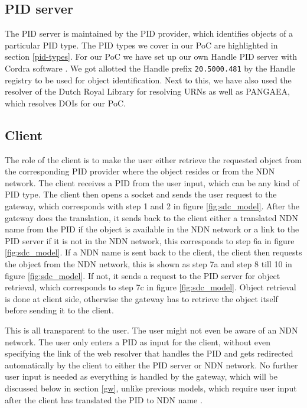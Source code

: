 \subsection{PID server}
The PID server is maintained by the PID provider, which identifies objects of a particular PID type. The PID types we cover in our PoC are highlighted in section \ref{pid-types}. For our PoC we have set up our own Handle PID server with Cordra software \cite{cor}. We got allotted the Handle prefix \texttt{20.5000.481} by the Handle registry to be used for object identification. Next to this, we have also used the resolver of the Dutch Royal Library for resolving URNs as well as PANGAEA, which resolves DOIs for our PoC.

\subsection{Client}
The role of the client is to make the user either retrieve the requested object from the corresponding PID provider where the object resides or from the NDN network. 
The client receives a PID from the user input, which can be any kind of PID type. The client then opens a socket and sends the user request to the gateway, which corresponds with step 1 and 2 in figure \ref{fig:sdc_model}. After the gateway does the translation, it sends back to the client either a translated NDN name from the PID if the object is available in the NDN network or a link to the PID server if it is not in the NDN network, this corresponds to step 6a in figure \ref{fig:sdc_model}. If a NDN name is sent back to the client, the client then requests the object from the NDN network, this is shown as step 7a and step 8 till 10 in figure \ref{fig:sdc_model}. If not, it sends a request to the PID server for object retrieval, which corresponds to step 7c in figure \ref{fig:sdc_model}. Object retrieval is done at client side, otherwise the gateway has to retrieve the object itself before sending it to the client.

This is all transparent to the user. The user might not even be aware of an NDN network. The user only enters a PID as input for the client, without even specifying the link of the web resolver that handles the PID and gets redirected automatically by the client to either the PID server or NDN network. No further user input is needed as everything is handled by the gateway, which will be discussed below in section \ref{gw}, %
unlike previous models, which require user input after the client has translated the PID to NDN name \cite{ndn-app-aware}. 

